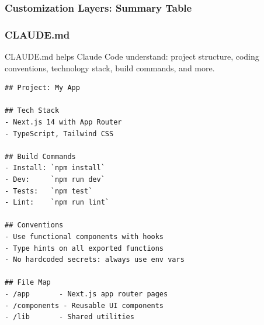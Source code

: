 \begin{frame}[fragile]\frametitle{Customization Layers: Summary Table}

\begin{center}
\end{center}

\end{frame}


\begin{frame}[fragile]\frametitle{CLAUDE.md}
CLAUDE.md helps Claude Code understand: project structure, coding conventions, technology stack, build commands, and more.

\begin{lstlisting}
## Project: My App

## Tech Stack
- Next.js 14 with App Router
- TypeScript, Tailwind CSS

## Build Commands
- Install: `npm install`
- Dev:     `npm run dev`
- Tests:   `npm test`
- Lint:    `npm run lint`

## Conventions
- Use functional components with hooks
- Type hints on all exported functions
- No hardcoded secrets: always use env vars

## File Map
- /app       - Next.js app router pages
- /components - Reusable UI components
- /lib       - Shared utilities
\end{lstlisting}
\end{frame}

